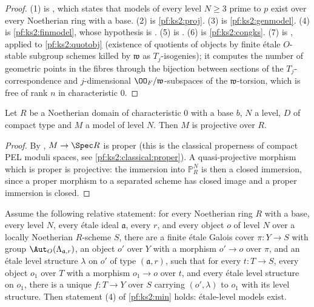 \begin{proof}
(1) is , which states that models of every level
$N\ge3$ prime to $p$ exist over every Noetherian ring with a base. (2) is \cref{pf:ks2:proj}. (3) is
\cref{pf:ks2:genmodel}. (4) is
\cref{pf:ks2:finmodel}, whose hypothesis is
. (5) is
. (6) is
\cref{pf:ks2:congks}. (7) is ,
applied to \cref{pf:ks2:quotobj} (existence of
quotients of objects by finite \'etale $O$-stable subgroup schemes killed by $\mathfrak w$ as
$T_j$-isogenies); it computes the number of geometric points in the fibres through the bijection
between sections of the $T_j$-correspondence and $j$-dimensional $\kstwoOF/\mathfrak w$-subspaces
of the $\mathfrak w$-torsion, which is free of rank $n$ in characteristic $0$.
\end{proof}

\begin{proposition}\label{pf:ks2:proj}
Let $R$ be a Noetherian domain of characteristic $0$ with a base $b$, $N$ a level, $D$ of compact
type and $M$ a model of level $N$. Then $M$ is projective over $R$.
\end{proposition}

\begin{proof}
By , $M\to\Spec R$ is
proper (this is the classical properness of compact PEL moduli spaces, see
\cref{pf:ks2:classical:proper}). A quasi-projective morphism which is proper is projective: the
immersion into $\mathbb P^N_R$ is then a closed immersion, since a proper morphism to a separated
scheme has closed image and a proper immersion is closed.
\end{proof}

\begin{proposition}\label{pf:ks2:finmodel}
Assume the following relative statement: for every Noetherian ring $R$ with a base, every level $N$,
every \'etale ideal $\mathfrak a$, every $r$, and every object $o$ of level $N$ over a locally
Noetherian $R$-scheme $S$, there are a finite \'etale Galois cover $\pi\colon Y\to S$ with group
$\Aut_O(\Lambda_{\mathfrak a,r})$, an object $o'$ over $Y$ with a morphism $o'\to o$ over $\pi$, and an
\'etale level structure $\lambda$ on $o'$ of type $(\mathfrak a,r)$, such that for every $t\colon
T\to S$, every object $o_1$ over $T$ with a morphism $o_1\to o$ over $t$, and every \'etale level
structure on $o_1$, there is a unique $f\colon T\to Y$ over $S$ carrying $(o',\lambda)$ to $o_1$ with
its level structure. Then statement (4) of \cref{pf:ks2:min} holds: \'etale-level models exist.
\end{proposition}

